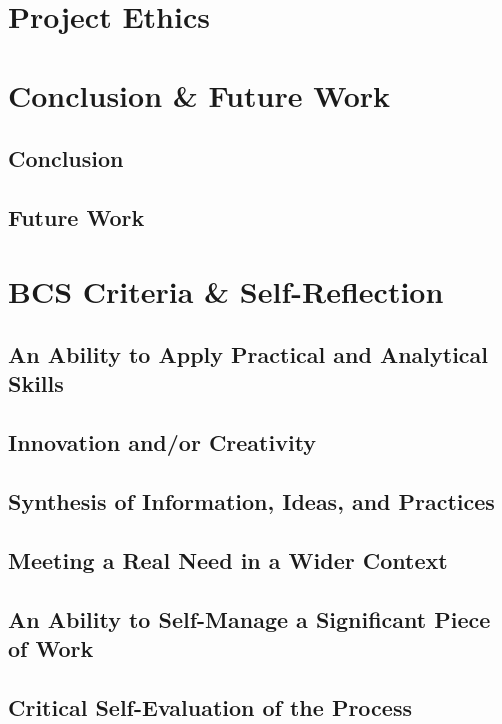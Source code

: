 \documentclass[12pt]{article}
\begin{document}
\section{Project Ethics}

\section{Conclusion \& Future Work}
\subsection{Conclusion}

\subsection{Future Work}

\section{BCS Criteria \& Self-Reflection}

\subsection{An Ability to Apply Practical and Analytical Skills}

\subsection{Innovation and/or Creativity}

\subsection{Synthesis of Information, Ideas, and Practices}

\subsection{Meeting a Real Need in a Wider Context}

\subsection{An Ability to Self-Manage a Significant Piece of Work}

\subsection{Critical Self-Evaluation of the Process}


\printbibliography
\printglossaries
\end{document}
